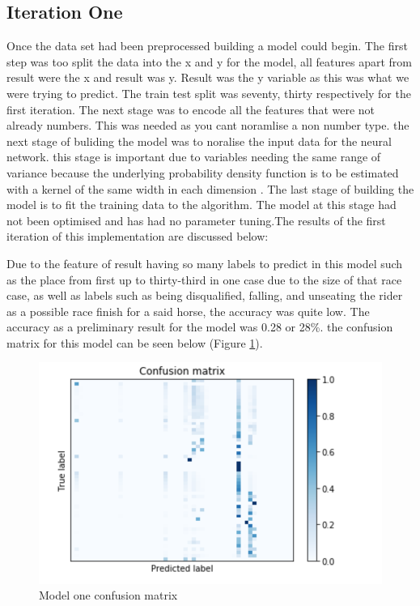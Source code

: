 \subsection{Iteration One}
Once the data set had been preprocessed building a model could begin. The first step was too split the data into the x and y for the model, all features apart from result were the x and result was y. Result was the y variable as this was what we were trying to predict. The train test split was seventy, thirty respectively for the first iteration. The next stage was to encode all the features that were not already numbers. This was needed as you cant noramlise a non number type. the next stage of buliding the model was to noralise the input data for the neural network. this stage is important due to variables needing the same range of variance because the underlying probability density function is to be estimated with a kernel of the same width in each dimension \cite{97934}. The last stage of building the model is to fit the training data to the algorithm. The model at this stage had not been optimised and has had no parameter tuning.The results of the first iteration of this implementation are discussed below: 

Due to the feature of result having so many labels to predict in this model such as the place from first up to thirty-third in one case due to the size of that race case, as well as  labels such as being disqualified, falling, and unseating the rider as a possible race finish for a said horse, the accuracy was quite low. The accuracy as a preliminary result for the model was 0.28 or 28\%. the confusion matrix for this model can be seen below (Figure \ref{fig:M1CF}).
\begin{figure}[h!]
  \centering
  \includegraphics[width = (\textwidth)/2]{model1.png}
  \caption{Model one confusion matrix}
  \label{fig:M1CF}
\end{figure}
